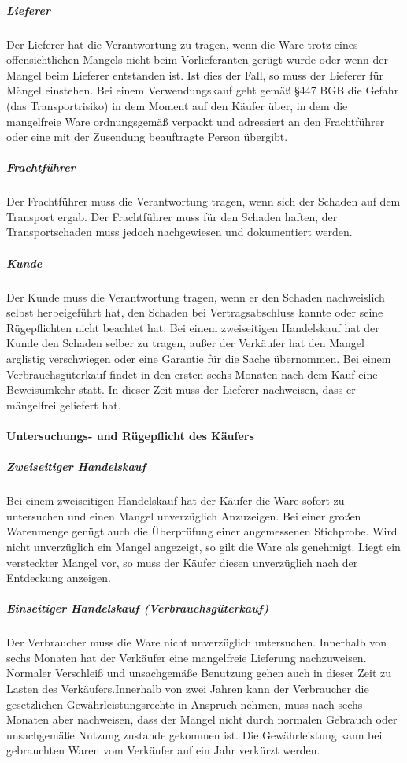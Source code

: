 \subparagraph{Lieferer} Der Lieferer hat die Verantwortung zu tragen, wenn die Ware trotz eines offensichtlichen Mangels nicht beim Vorlieferanten gerügt wurde oder wenn der Mangel beim Lieferer entstanden ist. Ist dies der Fall, so muss der Lieferer für Mängel einstehen. Bei einem Verwendungskauf geht gemäß §447 BGB die Gefahr (das Transportrisiko) in dem Moment auf den Käufer über, in dem die mangelfreie Ware ordnungsgemäß verpackt und adressiert an den Frachtführer oder eine mit der Zusendung beauftragte Person übergibt.

\subparagraph{Frachtführer} Der Frachtführer muss die Verantwortung tragen, wenn sich der Schaden auf dem Transport ergab. Der Frachtführer muss für den Schaden haften, der Transportschaden muss jedoch nachgewiesen und dokumentiert werden.

\subparagraph{Kunde} Der Kunde muss die Verantwortung tragen, wenn er den Schaden nachweislich selbst herbeigeführt hat, den Schaden bei Vertragsabschluss kannte oder seine Rügepflichten nicht beachtet hat. Bei einem zweiseitigen Handelskauf hat der Kunde den Schaden selber zu tragen, außer der Verkäufer hat den Mangel arglistig verschwiegen oder eine Garantie für die Sache übernommen. Bei einem Verbrauchsgüterkauf findet in den ersten sechs Monaten nach dem Kauf eine Beweisumkehr statt. In dieser Zeit muss der Lieferer nachweisen, dass er mängelfrei geliefert hat.
	
\paragraph{Untersuchungs- und Rügepflicht des Käufers}

\subparagraph{Zweiseitiger Handelskauf} Bei einem zweiseitigen Handelskauf hat der Käufer die Ware sofort zu untersuchen und einen Mangel unverzüglich Anzuzeigen. Bei einer großen Warenmenge genügt auch die Überprüfung einer angemessenen Stichprobe. Wird nicht unverzüglich ein Mangel angezeigt, so gilt die Ware als genehmigt. Liegt ein versteckter Mangel vor, so muss der Käufer diesen unverzüglich nach der Entdeckung anzeigen.

\subparagraph{Einseitiger Handelskauf (Verbrauchsgüterkauf)} Der Verbraucher muss die Ware nicht unverzüglich untersuchen. Innerhalb von sechs Monaten hat der Verkäufer eine mangelfreie Lieferung nachzuweisen. Normaler Verschleiß und unsachgemäße Benutzung gehen auch in dieser Zeit zu Lasten des Verkäufers.Innerhalb von zwei Jahren kann der Verbraucher die gesetzlichen Gewährleistungsrechte in Anspruch nehmen, muss nach sechs Monaten aber nachweisen, dass der Mangel nicht durch normalen Gebrauch oder unsachgemäße Nutzung zustande gekommen ist. Die Gewährleistung kann bei gebrauchten Waren vom Verkäufer auf ein Jahr verkürzt werden.
	
